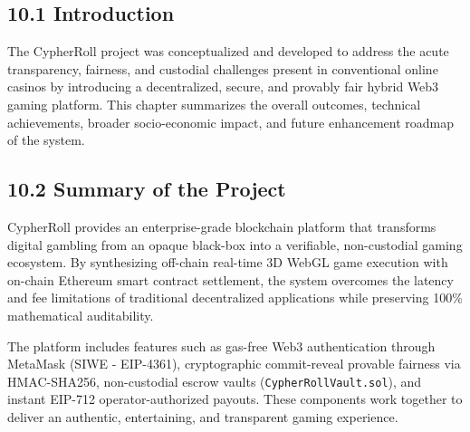 \vspace{1.0cm}
\par
\label{chap:conclusion}
\vspace{0.15cm}
\par
\vspace{0.3cm}

\subsection*{10.1 Introduction}
The CypherRoll project was conceptualized and developed to address the acute transparency, fairness, and custodial challenges present in conventional online casinos by introducing a decentralized, secure, and provably fair hybrid Web3 gaming platform. This chapter summarizes the overall outcomes, technical achievements, broader socio-economic impact, and future enhancement roadmap of the system.

\subsection*{10.2 Summary of the Project}
CypherRoll provides an enterprise-grade blockchain platform that transforms digital gambling from an opaque black-box into a verifiable, non-custodial gaming ecosystem. By synthesizing off-chain real-time 3D WebGL game execution with on-chain Ethereum smart contract settlement, the system overcomes the latency and fee limitations of traditional decentralized applications while preserving 100\% mathematical auditability.

The platform includes features such as gas-free Web3 authentication through MetaMask (SIWE - EIP-4361), cryptographic commit-reveal provable fairness via HMAC-SHA256, non-custodial escrow vaults (\texttt{CypherRollVault.sol}), and instant EIP-712 operator-authorized payouts. These components work together to deliver an authentic, entertaining, and transparent gaming experience.

